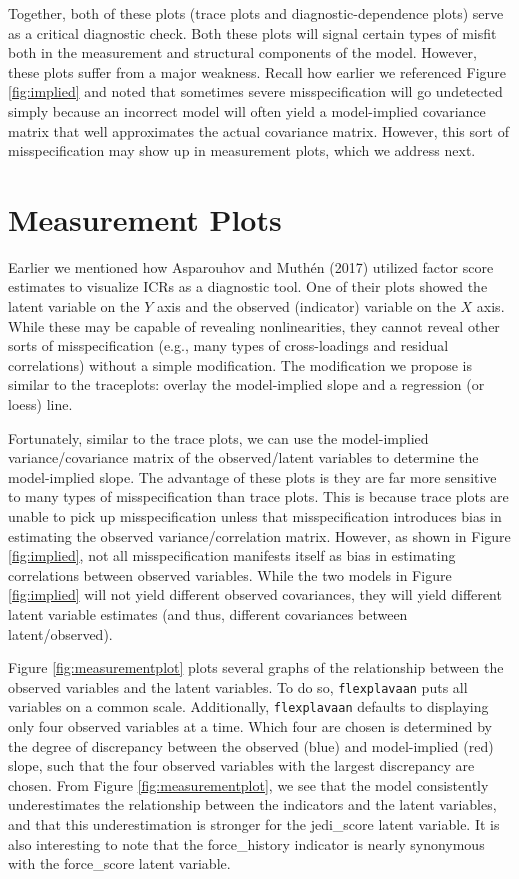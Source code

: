 \documentclass[
  english,
  doc]{apa6}
\begin{document}
Together, both of these plots (trace plots and diagnostic-dependence plots) serve as a critical diagnostic check. Both these plots will signal certain types of misfit both in the measurement and structural components of the model. However, these plots suffer from a major weakness. Recall how earlier we referenced Figure \ref{fig:implied} and noted that sometimes severe misspecification will go undetected simply because an incorrect model will often yield a model-implied covariance matrix that well approximates the actual covariance matrix. However, this sort of misspecification may show up in measurement plots, which we address next.

\hypertarget{measurement-plots}{%
\section{Measurement Plots}\label{measurement-plots}}

Earlier we mentioned how Asparouhov and Muthén (2017) utilized factor score estimates to visualize ICRs as a diagnostic tool. One of their plots showed the latent variable on the \(Y\) axis and the observed (indicator) variable on the \(X\) axis. While these may be capable of revealing nonlinearities, they cannot reveal other sorts of misspecification (e.g., many types of cross-loadings and residual correlations) without a simple modification. The modification we propose is similar to the traceplots: overlay the model-implied slope and a regression (or loess) line.

Fortunately, similar to the trace plots, we can use the model-implied variance/covariance matrix of the observed/latent variables to determine the model-implied slope. The advantage of these plots is they are far more sensitive to many types of misspecification than trace plots. This is because trace plots are unable to pick up misspecification unless that misspecification introduces bias in estimating the observed variance/correlation matrix. However, as shown in Figure \ref{fig:implied}, not all misspecification manifests itself as bias in estimating correlations between observed variables. While the two models in Figure \ref{fig:implied} will not yield different observed covariances, they will yield different latent variable estimates (and thus, different covariances between latent/observed).

Figure \ref{fig:measurementplot} plots several graphs of the relationship between the observed variables and the latent variables. To do so, \texttt{flexplavaan} puts all variables on a common scale. Additionally, \texttt{flexplavaan} defaults to displaying only four observed variables at a time. Which four are chosen is determined by the degree of discrepancy between the observed (blue) and model-implied (red) slope, such that the four observed variables with the largest discrepancy are chosen. From Figure \ref{fig:measurementplot}, we see that the model consistently underestimates the relationship between the indicators and the latent variables, and that this underestimation is stronger for the jedi\_score latent variable. It is also interesting to note that the force\_history indicator is nearly synonymous with the force\_score latent variable.
\end{document}
